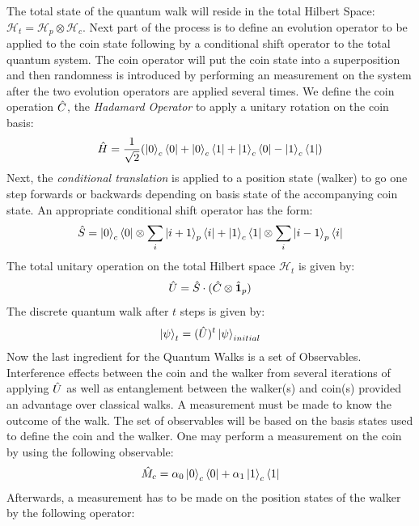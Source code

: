 \indent The total state of the quantum walk will reside in the total Hilbert Space: $\mathcal{H}_{t} = \mathcal{H}_{p} \otimes \mathcal{H}_{c}$. Next part of the process is to define an evolution operator to be applied to the coin state following by a conditional shift operator to the total quantum system. The coin operator will put the coin state into a superposition and then randomness is introduced by performing an measurement on the system after the two evolution operators are applied several times. We define the coin operation $\Hat{C}$, the \textit{Hadamard Operator} to apply a unitary rotation on the coin basis: 
\begin{equation}
    \Hat{H} = \frac{1}{\sqrt{2}} (\ket{0}_{c}\bra{0} + \ket{0}_{c}\bra{1} + \ket{1}_{c}\bra{0} - \ket{1}_{c}\bra{1})
\end{equation}
Next, the \textit{conditional translation} is applied to a position state (walker) to go one step forwards or backwards depending on basis state of the accompanying coin state. An appropriate conditional shift operator has the form: 
\begin{equation}
    \Hat{S} = \ket{0}_{c}\bra{0} \otimes \sum_{i} \ket{i + 1}_{p}\bra{i} + \ket{1}_{c}\bra{1} \otimes \sum_{i}\ket{i-1}_{p}\bra{i}
\end{equation}
The total unitary operation on the total Hilbert space $\mathcal{H}_{t}$ is given by:
\begin{equation}
    \Hat{U} = \Hat{S} \cdot (\Hat{C} \otimes \Hat{\textbf{1}}_{p})
\end{equation}
The discrete quantum walk after $t$ steps is given by: 
\begin{equation}
    \ket{\psi}_{t} = (\Hat{U})^{t}\ket{\psi}_{initial}
\end{equation}
Now the last ingredient for the Quantum Walks is a set of Observables. Interference effects between the coin and the walker from several iterations of applying $\Hat{U}$ as well as entanglement between the walker(s) and coin(s) provided an advantage over classical walks. A measurement must be made to know the outcome of the walk. The set of observables will be based on the basis states used to define the coin and the walker. \newline 
\indent One may perform a measurement on the coin by using the following observable:
\begin{equation}
    \hat{M}_{c} = \alpha_{0}\ket{0}_{c}\bra{0} + \alpha_{1}\ket{1}_{c}\bra{1}
\end{equation}
Afterwards, a measurement has to be made on the position states of the walker by the following operator:
